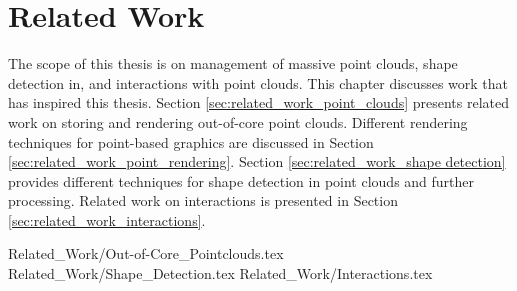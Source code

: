 \chapter {Related Work}
\label{chap:related_work}

The scope of this thesis is on management of massive point clouds, shape detection in, and interactions with point clouds. This chapter discusses work that has inspired this thesis. Section \ref{sec:related_work_point_clouds} presents related work on storing and rendering out-of-core point clouds. Different rendering techniques for point-based graphics are discussed in Section \ref{sec:related_work_point_rendering}. Section \ref{sec:related_work_shape detection} provides different techniques for shape detection in point clouds and further processing. Related work on interactions is presented in Section \ref{sec:related_work_interactions}. 

 {Related_Work/Out-of-Core_Pointclouds.tex}
 {Related_Work/Shape_Detection.tex}
 {Related_Work/Interactions.tex}